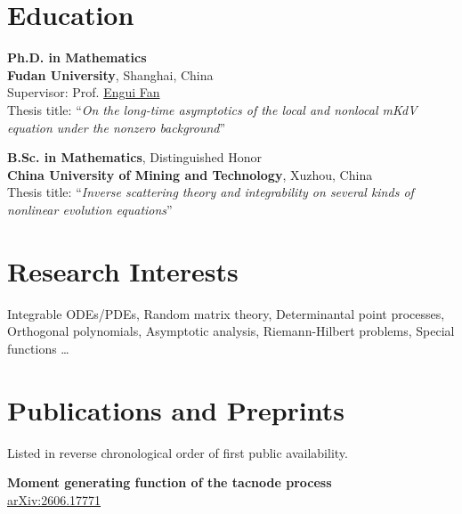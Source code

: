 \documentclass[12pt,a4paper]{article}
\begin{document}
\begin{cv}{}
\section{Education}
\begin{cvlist}{}
  \item[Sep 2019 -- Jun 2024]
    \textbf{Ph.D. in Mathematics}\\
    \textbf{Fudan University}, Shanghai, China\\
    Supervisor: Prof. \href{https://math.fudan.edu.cn/fa/25/c30607a326181/page.htm}{Engui Fan}\\
    Thesis title: ``{\slshape On the long-time asymptotics of the local and nonlocal mKdV equation under the nonzero background}''

  \item[Sep 2015 -- Jun 2019]
    \textbf{B.Sc. in Mathematics}, Distinguished Honor\\
    \textbf{China University of Mining and Technology}, Xuzhou, China\\
    Thesis title: ``{\slshape Inverse scattering theory and integrability on several kinds of nonlinear evolution equations}''
\end{cvlist}


\section{Research Interests}
Integrable ODEs/PDEs, Random matrix theory, Determinantal point processes,
Orthogonal polynomials, Asymptotic analysis, Riemann-Hilbert problems, Special functions \dots


\section{Publications and Preprints}
Listed in reverse chronological order of first public availability.

\begin{etaremune}
    \item \textbf{Moment generating function of the tacnode process} \\
    \href{https://arxiv.org/abs/2606.17771}{arXiv:2606.17771}


\end{etaremune}
\end{cv}
\end{document}
